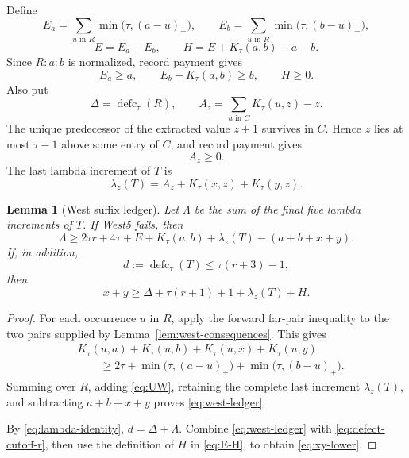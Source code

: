 \documentclass[11pt]{article}
\newtheorem{lemma}[theorem]{Lemma}
\theoremstyle{definition}
\theoremstyle{remark}
\newcommand{\defc}{\operatorname{defc}}
\begin{document}
Define
\[
 E_a=\sum_{u\text{ in }R}\min\bigl(\tau,(a-u)_+\bigr),
 \qquad
 E_b=\sum_{u\text{ in }R}\min\bigl(\tau,(b-u)_+\bigr),
\]
\begin{equation}
 E=E_a+E_b,
 \qquad
 H=E+K_\tau(a,b)-a-b.
 \label{eq:E-H}
\end{equation}
Since $R:a:b$ is normalized, record payment gives
\begin{equation}
 E_a\ge a,
 \qquad
 E_b+K_\tau(a,b)\ge b,
 \qquad
 H\ge0.
 \label{eq:H-nonnegative}
\end{equation}
Also put
\begin{equation}
 \Delta=\defc_\tau(R),
 \qquad
 A_z=\sum_{u\text{ in }C}K_\tau(u,z)-z.
 \label{eq:Delta-Az}
\end{equation}
The unique predecessor of the extracted value $z+1$ survives in $C$.
Hence $z$ lies at most $\tau-1$ above some entry of $C$, and record
payment gives
\begin{equation}
 A_z\ge0.
 \label{eq:Az-nonnegative}
\end{equation}
The last lambda increment of $T$ is
\begin{equation}
 \lambda_z(T)=A_z+K_\tau(x,z)+K_\tau(y,z).
 \label{eq:lambda-z}
\end{equation}

\begin{lemma}[West suffix ledger]
\label{lem:west-ledger}
Let $\Lambda$ be the sum of the final five lambda increments of $T$.
If West5 fails, then
\begin{equation}
 \Lambda\ge
 2\tau r+4\tau+E+K_\tau(a,b)+\lambda_z(T)
 -(a+b+x+y).
 \label{eq:west-ledger}
\end{equation}
If, in addition,
\begin{equation}
 d:=\defc_\tau(T)\le\tau(r+3)-1,
 \label{eq:defect-cutoff-r}
\end{equation}
then
\begin{equation}
 x+y\ge
 \Delta+\tau(r+1)+1+\lambda_z(T)+H.
 \label{eq:xy-lower}
\end{equation}
\end{lemma}

\begin{proof}
For each occurrence $u$ in $R$, apply the forward far-pair inequality to
the two pairs supplied by Lemma~\ref{lem:west-consequences}.  This gives
\[
\begin{aligned}
 &K_\tau(u,a)+K_\tau(u,b)+K_\tau(u,x)+K_\tau(u,y)\\
 &\qquad\ge2\tau+
 \min\bigl(\tau,(a-u)_+\bigr)+
 \min\bigl(\tau,(b-u)_+\bigr).
\end{aligned}
\]
Summing over $R$, adding \eqref{eq:UW}, retaining the complete last
increment $\lambda_z(T)$, and subtracting $a+b+x+y$ proves
\eqref{eq:west-ledger}.

By \eqref{eq:lambda-identity}, $d=\Delta+\Lambda$.  Combine
\eqref{eq:west-ledger} with \eqref{eq:defect-cutoff-r}, then use the
definition of $H$ in \eqref{eq:E-H}, to obtain
\eqref{eq:xy-lower}.
\end{proof}
\end{document}
